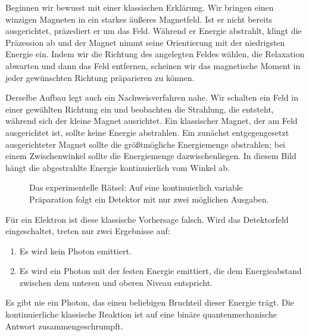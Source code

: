 Beginnen wir bewusst mit einer klassischen Erklärung. Wir bringen einen winzigen Magneten in ein starkes äußeres Magnetfeld. Ist er nicht bereits ausgerichtet, präzediert er um das Feld. Während er Energie abstrahlt, klingt die Präzession ab und der Magnet nimmt seine Orientierung mit der niedrigsten Energie ein. Indem wir die Richtung des angelegten Feldes wählen, die Relaxation abwarten und dann das Feld entfernen, scheinen wir das magnetische Moment in jeder gewünschten Richtung präparieren zu können.

Derselbe Aufbau legt auch ein Nachweisverfahren nahe. Wir schalten ein Feld in einer gewählten Richtung ein und beobachten die Strahlung, die entsteht, während sich der kleine Magnet ausrichtet. Ein klassischer Magnet, der am Feld ausgerichtet ist, sollte keine Energie abstrahlen. Ein zunächst entgegengesetzt ausgerichteter Magnet sollte die größtmögliche Energiemenge abstrahlen; bei einem Zwischenwinkel sollte die Energiemenge dazwischenliegen. In diesem Bild hängt die abgestrahlte Energie kontinuierlich vom Winkel ab.

\begin{figure}[htbp]\centering
\begin{coursefitfigure}\end{coursefitfigure}\caption{Das experimentelle Rätsel: Auf eine kontinuierlich variable Präparation folgt ein Detektor mit nur zwei möglichen Ausgaben.}\end{figure}

Für ein Elektron ist diese klassische Vorhersage falsch. Wird das Detektorfeld eingeschaltet, treten nur zwei Ergebnisse auf:
\begin{enumerate}\item Es wird kein Photon emittiert.
\item Es wird ein Photon mit der festen Energie emittiert, die dem Energieabstand zwischen dem unteren und oberen Niveau entspricht.\end{enumerate}
Es gibt nie ein Photon, das einen beliebigen Bruchteil dieser Energie trägt. Die kontinuierliche klassische Reaktion ist auf eine binäre quantenmechanische Antwort zusammengeschrumpft.

